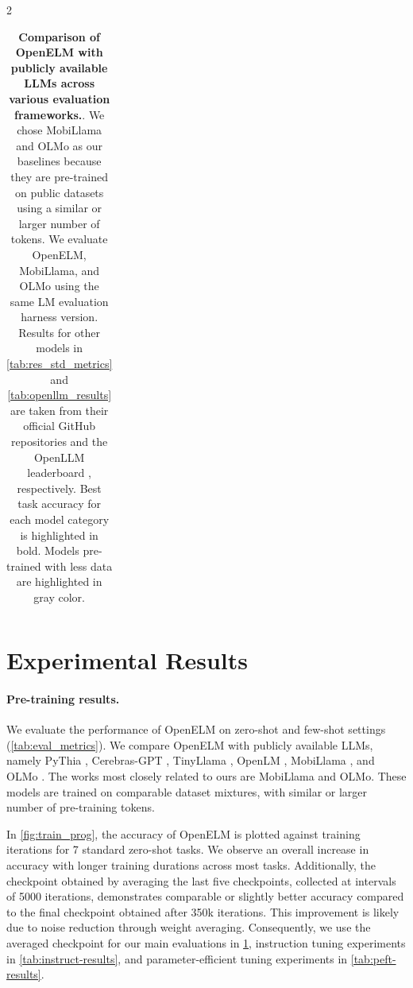 \documentclass[10pt,twocolumn,letterpaper]{article}
\makeatletter
\newcommand{\model}{OpenELM\@\xspace}
\newcommand{\gc}[1]{\textcolor{deemph}{#1}}
\makeatother
\begin{document}
\begin{table}[t!]
\begin{subtable}[c]{2\columnwidth}
{\begin{tabular}{l|cc|cccccccc|c}
\end{tabular}
}
\caption{Results on LLM360 tasks with respect to the metrics defined in \cref{tab:llm360}.}
\label{tab:llm360_res}
\end{subtable}
\caption{\textbf{Comparison of \model with publicly available LLMs across various evaluation frameworks.}. We chose MobiLlama and OLMo as our baselines because they are pre-trained on public datasets using a similar or larger number of tokens. We evaluate \model, MobiLlama, and OLMo using the same LM evaluation harness version. Results for other models in \cref{tab:res_std_metrics} and \cref{tab:openllm_results} are taken from their official GitHub repositories and the OpenLLM leaderboard \cite{open-llm-leaderboard}, respectively. Best task accuracy for each model category is highlighted in bold. Models pre-trained with less data are highlighted in \gc{gray} color.
}
\label{tab:results}
\end{table}

\section{Experimental Results}
\label{sec:results}

\paragraph{Pre-training results.} We evaluate the performance of \model on zero-shot and few-shot settings (\cref{tab:eval_metrics}). We compare \model with publicly available LLMs, namely PyThia \cite{biderman2023pythia}, Cerebras-GPT \cite{dey2023cerebras}, TinyLlama \cite{zhang2024tinyllama}, OpenLM \cite{openlm}, MobiLlama \cite{thawakar2024mobillama}, and OLMo \cite{groeneveld2024olmo}. The works most closely related to ours are MobiLlama and OLMo. These models are trained on comparable dataset mixtures, with similar or larger number of pre-training tokens.

In \cref{fig:train_prog}, the accuracy of \model is plotted against training iterations for 7 standard zero-shot tasks. We observe an overall increase in accuracy with longer training durations across most tasks. Additionally, the checkpoint obtained by averaging the last five checkpoints, collected at intervals of 5000 iterations, demonstrates comparable or slightly better accuracy compared to the final checkpoint obtained after 350k iterations. This improvement is likely due to noise reduction through weight averaging. Consequently, we use the averaged checkpoint for our main evaluations in \cref{tab:results}, instruction tuning experiments in \cref{tab:instruct-results}, and parameter-efficient tuning experiments in \cref{tab:peft-results}.
\end{document}
